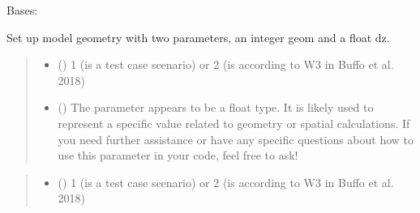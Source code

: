 \documentclass[a4paper,11pt,english,openany]{sphinxmanual}
\begin{document}
\begin{fulllineitems}
\label{\detokenize{api/spyice.preprocess.geometry_settings:src.spyice.preprocess.geometry_settings.GeometrySettings}}
\pysigstartsignatures
\pysigline
{}
\pysigstopsignatures
\sphinxAtStartPar
Bases: 

\sphinxAtStartPar
Set up model geometry with two parameters, an integer geom and a float dz.
\begin{quote}\begin{description}
\begin{itemize}
\item {} 
\sphinxAtStartPar
{} () \textendash{} 1 (is a test case scenario) or  2 (is according to W3 in Buffo et al. 2018)

\item {} 
\sphinxAtStartPar
{} () \textendash{} The parameter  appears to be a float type. It is likely used to represent a specific value related to geometry or spatial calculations. If you need further assistance or have any specific questions about how to use this parameter in your code, feel free to ask!

\end{itemize}

\end{description}\end{quote}

\begin{fulllineitems}
\label{\detokenize{api/spyice.preprocess.geometry_settings:src.spyice.preprocess.geometry_settings.GeometrySettings.__init__}}
\pysigstartsignatures
\pysiglinewithargsret
{}
{\sphinxparamcomma {}}
{}
\pysigstopsignatures\begin{quote}\begin{description}
\begin{itemize}
\item {} 
\sphinxAtStartPar
{} () \textendash{} 1 (is a test case scenario) or  2 (is according to W3 in Buffo et al. 2018)


\end{itemize}
\end{description}
\end{quote}
\end{fulllineitems}
\end{fulllineitems}
\end{document}
